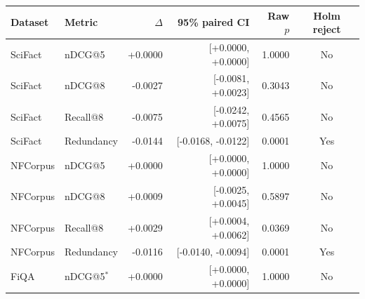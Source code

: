\begin{tabular}{llrrrc}
\toprule
Dataset & Metric & $\Delta$ & 95\% paired CI & Raw $p$ & Holm reject\\
\midrule
SciFact & nDCG@5 & +0.0000 & [+0.0000, +0.0000] & 1.0000 & No\\
SciFact & nDCG@8 & -0.0027 & [-0.0081, +0.0023] & 0.3043 & No\\
SciFact & Recall@8 & -0.0075 & [-0.0242, +0.0075] & 0.4565 & No\\
SciFact & Redundancy & -0.0144 & [-0.0168, -0.0122] & 0.0001 & Yes\\
NFCorpus & nDCG@5 & +0.0000 & [+0.0000, +0.0000] & 1.0000 & No\\
NFCorpus & nDCG@8 & +0.0009 & [-0.0025, +0.0045] & 0.5897 & No\\
NFCorpus & Recall@8 & +0.0029 & [+0.0004, +0.0062] & 0.0369 & No\\
NFCorpus & Redundancy & -0.0116 & [-0.0140, -0.0094] & 0.0001 & Yes\\
FiQA & nDCG@5$^*$ & +0.0000 & [+0.0000, +0.0000] & 1.0000 & No\\
\bottomrule
\end{tabular}
